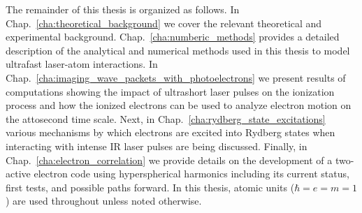 The remainder of this thesis is organized as follows. In Chap.~\ref{cha:theoretical_background} we cover the relevant theoretical and experimental background. Chap.~\ref{cha:numberic_methods} provides a detailed description of the analytical and numerical methods used in this thesis to model ultrafast laser-atom interactions. In Chap.~\ref{cha:imaging_wave_packets_with_photoelectrons} we present results of computations showing the impact of ultrashort laser pulses on the ionization process and how the ionized electrons can be used to analyze electron motion on the attosecond time scale. Next, in Chap.~\ref{cha:rydberg_state_excitations} various mechanisms by which electrons are excited into Rydberg states when interacting with intense IR laser pulses are being discussed. Finally, in Chap.~\ref{cha:electron_correlation} we provide details on the development of a two-active electron code using hyperspherical harmonics including its current status, first tests, and possible paths forward.
In this thesis, atomic units ($\hbar=e=m=1$) are used throughout unless noted otherwise.
